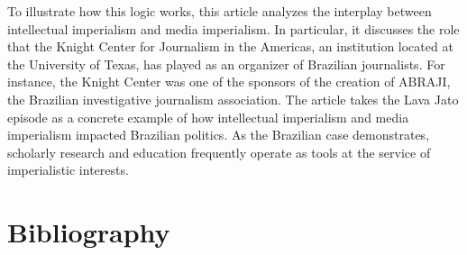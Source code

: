 \documentclass{tufte-handout}
\begin{document}
To illustrate how this logic works, this article analyzes the interplay
between intellectual imperialism and media imperialism. In particular,
it discusses the role that the Knight Center for Journalism in the
Americas, an institution located at the University of Texas, has played
as an organizer of Brazilian journalists. For instance, the Knight
Center was one of the sponsors of the creation of ABRAJI, the Brazilian
investigative journalism association. The article takes the Lava Jato
episode as a concrete example of how intellectual imperialism and media
imperialism impacted Brazilian politics. As the Brazilian case
demonstrates, scholarly research and education frequently operate as
tools at the service of imperialistic interests.




\section{Bibliography}\label{bibliography}
\end{document}
